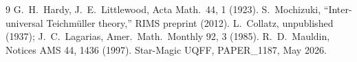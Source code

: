 \documentclass[11pt]{article}
\begin{document}
\begin{thebibliography}{9}
 G.\ H.\ Hardy, J.\ E.\ Littlewood, Acta Math.\ 44, 1 (1923).
 S.\ Mochizuki, ``Inter-universal Teichm\"uller theory,'' RIMS preprint (2012).
 L.\ Collatz, unpublished (1937); J.\ C.\ Lagarias, Amer.\ Math.\ Monthly 92, 3 (1985).
 R.\ D.\ Mauldin, Notices AMS 44, 1436 (1997).
 Star-Magic UQFF, PAPER\_1187, May 2026.
\end{thebibliography}
\end{document}
